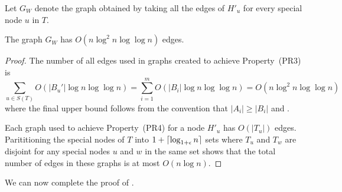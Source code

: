 \documentclass{patmorin}
\begin{document}
Let $G_W$ denote the graph obtained by taking all the edges of $H'_u$
for every special node $u$ in $T$.

\begin{clm}
  The graph $G_W$ has $O(n\log^2 n\log\log n)$ edges.
\end{clm}

\begin{proof}
  The number of all edges used in graphs created to achieve Property~(PR3) is
  \[
      \sum_{u\in S(T)}O(|B_u'|\log n\log\log n)
      = \sum_{i=1}^m O(|B_i|\log n\log\log n)
      = O(n\log^2 n\log\log n)
  \]
  where the final upper bound follows from the convention that $|A_i|\ge
  |B_i|$ and .

  Each graph used to achieve Property~(PR4) for a node $H'_u$ has
  $O(|T_u|)$ edges.  Parititioning the special nodes of $T$ into
  $1+{\lceil \log_{1+\epsilon} n \rceil}$ sets where $T_u$ and $T_w$ are disjoint
  for any special nodes $u$ and $w$ in the same set shows that the total
  number of edges in these graphs is at most $O(n\log n)$.
\end{proof}

%
%

We can now complete the proof of .
\end{document}
